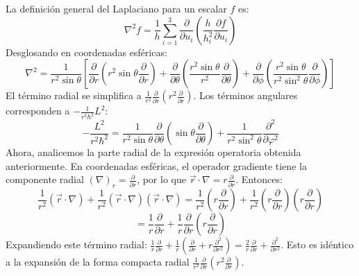 \documentclass[a4paper]{article}
\begin{document}
La definición general del Laplaciano para un escalar $f$ es:
\begin{equation}
\nabla^2 f = \frac{1}{h} \sum_{i=1}^3 \frac{\partial}{\partial u_i} \left( \frac{h}{h_i^2} \frac{\partial f}{\partial u_i} \right)
\end{equation}
Desglosando en coordenadas esféricas:
\begin{equation}
\nabla^2 = \frac{1}{r^2 \sin \theta} \left[ \frac{\partial}{\partial r} \left( r^2 \sin \theta \frac{\partial}{\partial r} \right) + \frac{\partial}{\partial \theta} \left( \frac{r^2 \sin \theta}{r^2} \frac{\partial}{\partial \theta} \right) + \frac{\partial}{\partial \phi} \left( \frac{r^2 \sin \theta}{r^2 \sin^2 \theta} \frac{\partial}{\partial \phi} \right) \right]
\end{equation}
El término radial se simplifica a $\frac{1}{r^2} \frac{\partial}{\partial r} (r^2 \frac{\partial}{\partial r})$. Los términos angulares corresponden a $-\frac{1}{r^2 \hbar^2} L^2$:
\begin{equation}
-\frac{L^2}{r^2 \hbar^2} = \frac{1}{r^2 \sin \theta} \frac{\partial}{\partial \theta} \left( \sin \theta \frac{\partial}{\partial \theta} \right) + \frac{1}{r^2 \sin^2 \theta} \frac{\partial^2}{\partial \varphi^2}
\end{equation}
Ahora, analicemos la parte radial de la expresión operatoria obtenida anteriormente. En coordenadas esféricas, el operador gradiente tiene la componente radial $(\nabla)_r = \frac{\partial}{\partial r}$, por lo que $\vec{r} \cdot \nabla = r \frac{\partial}{\partial r}$. Entonces:
\begin{equation}
\frac{1}{r^2} (\vec{r} \cdot \nabla) + \frac{1}{r^2} (\vec{r} \cdot \nabla) (\vec{r} \cdot \nabla) = \frac{1}{r^2} \left( r \frac{\partial}{\partial r} \right) + \frac{1}{r^2} \left( r \frac{\partial}{\partial r} \right) \left( r \frac{\partial}{\partial r} \right)
\end{equation}
\begin{equation}
= \frac{1}{r} \frac{\partial}{\partial r} + \frac{1}{r} \frac{\partial}{\partial r} \left( r \frac{\partial}{\partial r} \right)
\end{equation}
Expandiendo este término radial: $\frac{1}{r} \frac{\partial}{\partial r} + \frac{1}{r} \left( \frac{\partial}{\partial r} + r \frac{\partial^2}{\partial r^2} \right) = \frac{2}{r} \frac{\partial}{\partial r} + \frac{\partial^2}{\partial r^2}$.
Esto es idéntico a la expansión de la forma compacta radial $\frac{1}{r^2} \frac{\partial}{\partial r} (r^2 \frac{\partial}{\partial r})$.
\end{document}
